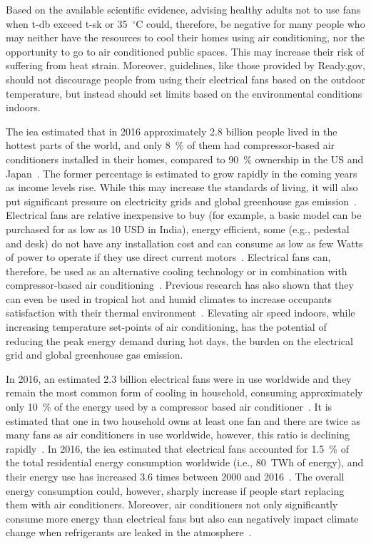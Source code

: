 Based on the available scientific evidence, advising healthy adults not to use fans when \ac{t-db} exceed \ac{t-sk} or 35~$^{\circ}$C could, therefore, be negative for many people who may neither have the resources to cool their homes using air conditioning, nor the opportunity to go to air conditioned public spaces.
This may increase their risk of suffering from heat strain.
Moreover, guidelines, like those provided by Ready.gov, should not discourage people from using their electrical fans based on the outdoor temperature, but instead should set limits based on the environmental conditions indoors.

The \ac{iea} estimated that in 2016 approximately 2.8 billion people lived in the hottest parts of the world, and only 8~\% of them had compressor-based air conditioners installed in their homes, compared to 90~\% ownership in the US and Japan~\cite{IEA2018}.
The former percentage is estimated to grow rapidly in the coming years as income levels rise.
While this may increase the standards of living, it will also put significant pressure on electricity grids and global greenhouse gas emission~\cite{IEA2018}.
Electrical fans are relative inexpensive to buy (for example, a basic model can be purchased for as low as 10 USD in India), energy efficient, some (e.g., pedestal and desk) do not have any installation cost and can consume as low as few Watts of power to operate if they use direct current motors~\cite{Yang2015a}.
Electrical fans can, therefore, be used as an alternative cooling technology or in combination with compressor-based air conditioning~\cite{Jay2019a, Hoyt2015, Schiavon2008}.
Previous research has also shown that they can even be used in tropical hot and humid climates to increase occupants satisfaction with their thermal environment~\cite{Lipczynska2018a}.
Elevating air speed indoors, while increasing temperature set-points of air conditioning, has the potential of reducing the peak energy demand during hot days, the burden on the electrical grid and global greenhouse gas emission.

In 2016, an estimated 2.3 billion electrical fans were in use worldwide and they remain the most common form of cooling in household, consuming approximately only 10~\% of the energy used by a compressor based air conditioner~\cite{IEA2018}.
It is estimated that one in two household owns at least one fan and there are twice as many fans as air conditioners in use worldwide, however, this ratio is declining rapidly~\cite{IEA2018}.
In 2016, the \ac{iea} estimated that electrical fans accounted for 1.5~\% of the total residential energy consumption worldwide (i.e., 80~TWh of energy), and their energy use has increased 3.6 times between 2000 and 2016~\cite{IEA2018}.
The overall energy consumption could, however, sharply increase if people start replacing them with air conditioners.
Moreover, air conditioners not only significantly consume more energy than electrical fans but also can negatively impact climate change when refrigerants are leaked in the atmosphere~\cite{IEA2018}.

